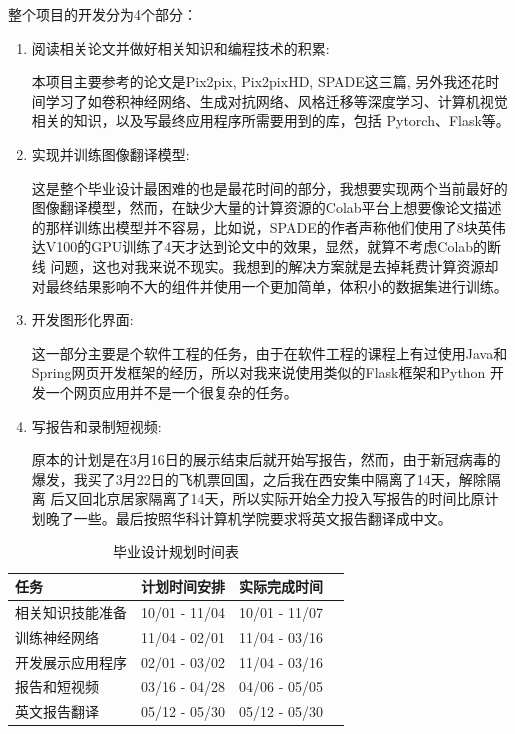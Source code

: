\documentclass[supercite]{HustGraduPaper}
\theoremstyle{definition}
\begin{document}
整个项目的开发分为4个部分：
\begin{enumerate}
  \item 阅读相关论文并做好相关知识和编程技术的积累:
  
  本项目主要参考的论文是Pix2pix\cite{pix2pix2016}, Pix2pixHD\cite{wang2018pix2pixHD}, SPADE\cite{park2019SPADE}这三篇, 
  另外我还花时间学习了如卷积神经网络、生成对抗网络、风格迁移等深度学习、计算机视觉相关的知识，以及写最终应用程序所需要用到的库，包括
  Pytorch、Flask等。
  \item 实现并训练图像翻译模型:
  
  这是整个毕业设计最困难的也是最花时间的部分，我想要实现两个当前最好的图像翻译模型，然而，在缺少大量的计算资源的Colab平台上想要像论文描述
  的那样训练出模型并不容易，比如说，SPADE的作者声称他们使用了8块英伟达V100的GPU训练了4天才达到论文中的效果，显然，就算不考虑Colab的断线
  问题，这也对我来说不现实。我想到的解决方案就是去掉耗费计算资源却对最终结果影响不大的组件并使用一个更加简单，体积小的数据集进行训练。
  \item 开发图形化界面: 
  
  这一部分主要是个软件工程的任务，由于在软件工程的课程上有过使用Java和Spring网页开发框架的经历，所以对我来说使用类似的Flask框架和Python
  开发一个网页应用并不是一个很复杂的任务。
  \item 写报告和录制短视频: 
  
  原本的计划是在3月16日的展示结束后就开始写报告，然而，由于新冠病毒的爆发，我买了3月22日的飞机票回国，之后我在西安集中隔离了14天，解除隔离
  后又回北京居家隔离了14天，所以实际开始全力投入写报告的时间比原计划晚了一些。最后按照华科计算机学院要求将英文报告翻译成中文。
\end{enumerate}
\begin{table}[H]
  \begin{center}
  \begin{tabular}{|l|l|l|l|}\hline\hline
  任务&计划时间安排&实际完成时间\\
  \hline
  相关知识技能准备&10/01 - 11/04&10/01 - 11/07\\
  训练神经网络&11/04 - 02/01&11/04 - 03/16\\
  开发展示应用程序&02/01 - 03/02&11/04 - 03/16\\
  报告和短视频&03/16 - 04/28&04/06 - 05/05\\
  英文报告翻译&05/12 - 05/30&05/12 - 05/30\\
  \hline\hline
  \end{tabular}
  \end{center}
  \caption{毕业设计规划时间表}
  \label{milestones table}
\end{table}
\end{document}
